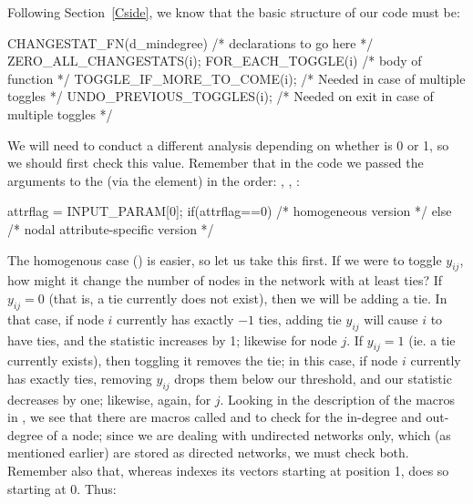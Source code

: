 \documentclass[nojss]{jss}
\begin{document}
Following Section~\ref{Cside}, we know that the basic structure of our  code must be:

\begin{CodeChunk}
\begin{CodeInput}
CHANGESTAT_FN(d_mindegree) {
  /* declarations to go here */
  ZERO_ALL_CHANGESTATS(i);
  FOR_EACH_TOGGLE(i) {
    /* body of function */
    TOGGLE_IF_MORE_TO_COME(i); /* Needed in case of multiple toggles */
  }
  UNDO_PREVIOUS_TOGGLES(i); /* Needed on exit in case of multiple toggles */
}
\end{CodeInput}
\end{CodeChunk}

We will need to conduct a different analysis depending on whether  is 0 or 1, so we should first check this value.  Remember that in the  code we passed the arguments to the  (via the  element) in the order: , , :

\begin{CodeChunk}
\begin{CodeInput}
  attrflag = INPUT_PARAM[0];
  if(attrflag==0){
    /* homogeneous version */
  }else{
    /* nodal attribute-specific version */
  }
\end{CodeInput}
\end{CodeChunk}

The homogenous case () is easier, so let us take this first.  If we were to toggle $y_{ij}$, how might it change the number of nodes in the network with at least  ties?  If $y_{ij}=0$ (that is, a tie currently does not exist), then we will be adding a tie. In that case, if node $i$ currently has exactly $-1$ ties, adding tie $y_{ij}$ will cause $i$ to have  ties, and the statistic increases by 1; likewise for node $j$.  If $y_{ij}=1$ (ie. a tie currently exists), then toggling it removes the tie; in this case, if node $i$ currently has exactly  ties, removing $y_{ij}$ drops them below our threshold, and our statistic decreases by one; likewise, again, for $j$. Looking in the description of the macros in , we see that there are macros called  and  to check for the in-degree and out-degree of a node; since we are dealing with undirected networks only, which (as mentioned earlier) are stored as directed networks, we must check both. Remember also that, whereas  indexes its vectors starting at position 1,  does so starting at 0. Thus:
\end{document}
